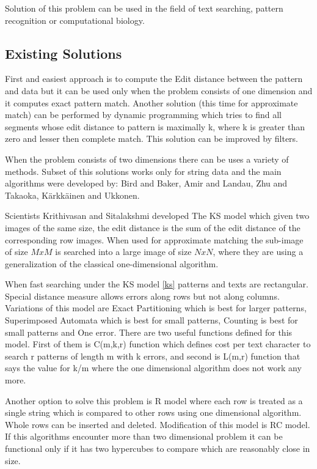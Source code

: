 Solution of this problem can be used in the field of text searching, pattern recognition or computational biology.

\subsection{Existing Solutions}

First and easiest approach is to compute the Edit distance between the pattern and data but it can be used only when the problem consists of one dimension and it computes exact pattern match. Another solution (this time for approximate match) can be performed by dynamic programming which tries to find all segments whose edit distance to pattern is maximally k, where k is greater than zero and lesser then complete match. This solution can be improved by filters.

When the problem consists of two dimensions there can be uses a variety of methods. Subset of this solutions works only for string data and the main algorithms were developed by: Bird and Baker, Amir and Landau, Zhu and Takaoka, K{\"a}rkk{\"a}inen and Ukkonen.

Scientists Krithivasan and Sitalakshmi developed The KS model which given two images of the same size, the edit distance is the sum of the edit distance of the corresponding row images. When used for approximate matching the sub-image of size $MxM$ is searched into a large image of size $NxN$, where they are using a generalization of the classical one-dimensional algorithm.

When fast searching under the KS model \ref{ks} patterns and texts are rectangular. Special distance measure allows errors along rows but not along columns. Variations of this model are Exact Partitioning which is best for larger patterns, Superimposed Automata which is best for small patterns, Counting is best for small patterns and One error. There are two useful functions defined for this model. First of them is C(m,k,r) function which defines cost per text character to search r patterns of length m with k errors, and second is L(m,r) function that says the value for k/m where the one dimensional algorithm does not work any more.

Another option to solve this problem is R model where each row is treated as a single string which is compared to other rows using one dimensional algorithm. Whole rows can be inserted and deleted. Modification of this model is RC model. If this algorithms encounter more than two dimensional problem it can be functional only if it has two hypercubes to compare which are reasonably close in size.

